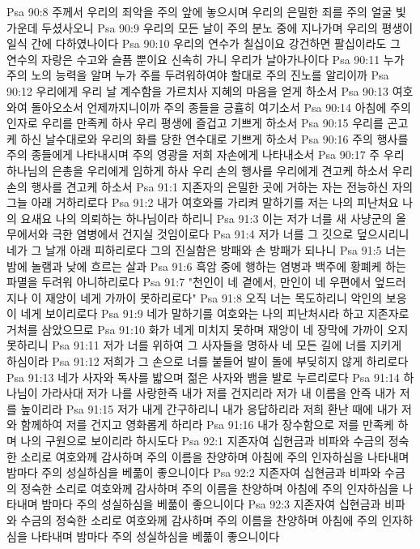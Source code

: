 Psa 90:8  주께서 우리의 죄악을 주의 앞에 놓으시며 우리의 은밀한 죄를 주의 얼굴 빛 가운데 두셨사오니
Psa 90:9  우리의 모든 날이 주의 분노 중에 지나가며 우리의 평생이 일식 간에 다하였나이다
Psa 90:10  우리의 연수가 칠십이요 강건하면 팔십이라도 그 연수의 자랑은 수고와 슬픔 뿐이요 신속히 가니 우리가 날아가나이다
Psa 90:11  누가 주의 노의 능력을 알며 누가 주를 두려워하여야 할대로 주의 진노를 알리이까
Psa 90:12  우리에게 우리 날 계수함을 가르치사 지혜의 마음을 얻게 하소서
Psa 90:13  여호와여 돌아오소서 언제까지니이까 주의 종들을 긍휼히 여기소서
Psa 90:14  아침에 주의 인자로 우리를 만족케 하사 우리 평생에 즐겁고 기쁘게 하소서
Psa 90:15  우리를 곤고케 하신 날수대로와 우리의 화를 당한 연수대로 기쁘게 하소서
Psa 90:16  주의 행사를 주의 종들에게 나타내시며 주의 영광을 저희 자손에게 나타내소서
Psa 90:17  주 우리 하나님의 은총을 우리에게 임하게 하사 우리 손의 행사를 우리에게 견고케 하소서 우리 손의 행사를 견고케 하소서
Psa 91:1  지존자의 은밀한 곳에 거하는 자는 전능하신 자의 그늘 아래 거하리로다
Psa 91:2  내가 여호와를 가리켜 말하기를 저는 나의 피난처요 나의 요새요 나의 의뢰하는 하나님이라 하리니
Psa 91:3  이는 저가 너를 새 사냥군의 올무에서와 극한 염병에서 건지실 것임이로다
Psa 91:4  저가 너를 그 깃으로 덮으시리니 네가 그 날개 아래 피하리로다 그의 진실함은 방패와 손 방패가 되나니
Psa 91:5  너는 밤에 놀램과 낮에 흐르는 살과
Psa 91:6  흑암 중에 행하는 염병과 백주에 황폐케 하는 파멸을 두려워 아니하리로다
Psa 91:7  "천인이 네 곁에서, 만인이 네 우편에서 엎드러지나 이 재앙이 네게 가까이 못하리로다"
Psa 91:8  오직 너는 목도하리니 악인의 보응이 네게 보이리로다
Psa 91:9  네가 말하기를 여호와는 나의 피난처시라 하고 지존자로 거처를 삼았으므로
Psa 91:10  화가 네게 미치지 못하며 재앙이 네 장막에 가까이 오지 못하리니
Psa 91:11  저가 너를 위하여 그 사자들을 명하사 네 모든 길에 너를 지키게 하심이라
Psa 91:12  저희가 그 손으로 너를 붙들어 발이 돌에 부딪히지 않게 하리로다
Psa 91:13  네가 사자와 독사를 밟으며 젊은 사자와 뱀을 발로 누르리로다
Psa 91:14  하나님이 가라사대 저가 나를 사랑한즉 내가 저를 건지리라 저가 내 이름을 안즉 내가 저를 높이리라
Psa 91:15  저가 내게 간구하리니 내가 응답하리라 저희 환난 때에 내가 저와 함께하여 저를 건지고 영화롭게 하리라
Psa 91:16  내가 장수함으로 저를 만족케 하며 나의 구원으로 보이리라 하시도다
Psa 92:1  지존자여 십현금과 비파와 수금의 정숙한 소리로 여호와께 감사하며 주의 이름을 찬양하며 아침에 주의 인자하심을 나타내며 밤마다 주의 성실하심을 베풂이 좋으니이다
Psa 92:2  지존자여 십현금과 비파와 수금의 정숙한 소리로 여호와께 감사하며 주의 이름을 찬양하며 아침에 주의 인자하심을 나타내며 밤마다 주의 성실하심을 베풂이 좋으니이다
Psa 92:3  지존자여 십현금과 비파와 수금의 정숙한 소리로 여호와께 감사하며 주의 이름을 찬양하며 아침에 주의 인자하심을 나타내며 밤마다 주의 성실하심을 베풂이 좋으니이다
